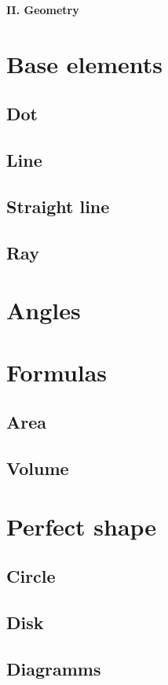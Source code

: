 \documentclass[a4paper]{article}
\begin{document}
\begin{multicols}{2}
		\columnbreak

		{\huge \textbf{II. Geometry}}

		{\Large \section {Base elements}}
		\subsection{Dot}
		\subsection{Line}
		\subsection{Straight line}
		\subsection{Ray}
		{\Large \section {Angles}}
		{\Large \section {Formulas}}
		\subsection{Area}
		\subsection{Volume}
		{\Large \section {Perfect shape}}
		\subsection{Circle}
		\subsection{Disk}
		\subsection{Diagramms}	

	\end{multicols}




		
\end{document}
